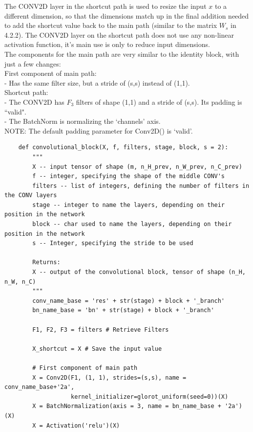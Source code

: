 \documentclass[11pt, a4paper]{article}
\begin{document}
\begin{spacing}{1.1}
	\noindent The CONV2D layer in the shortcut path is used to resize the input $x$ to a different dimension, so that the dimensions match up in the final addition needed to add the shortcut value back to the main path (similar to the matrix $W_s$ in 4.2.2). The CONV2D layer on the shortcut path does not use any non-linear activation function, it's main use is only to reduce input dimensions. \vspace*{2mm}\\
	The components for the main path are very similar to the identity block, with just a few changes: \vspace*{1mm}\\
	First component of main path: \\
	- Has the same filter size, but a stride of (s,s) instead of (1,1). \vspace*{1mm}\\
	Shortcut path: \\
	- The CONV2D has $F_3$ filters of shape (1,1) and a stride of (s,s). Its padding is ``valid".\\
	- The BatchNorm is normalizing the `channels' axis. \vspace*{1mm}\\
	NOTE: The default padding parameter for Conv2D() is `valid'.
	\begin{lstlisting}
	def convolutional_block(X, f, filters, stage, block, s = 2):
		"""
		X -- input tensor of shape (m, n_H_prev, n_W_prev, n_C_prev)
		f -- integer, specifying the shape of the middle CONV's
		filters -- list of integers, defining the number of filters in the CONV layers
		stage -- integer to name the layers, depending on their position in the network
		block -- char used to name the layers, depending on their position in the network
		s -- Integer, specifying the stride to be used
		
		Returns:
		X -- output of the convolutional block, tensor of shape (n_H, n_W, n_C)
		"""
		conv_name_base = 'res' + str(stage) + block + '_branch'
		bn_name_base = 'bn' + str(stage) + block + '_branch'
		
		F1, F2, F3 = filters # Retrieve Filters
		
		X_shortcut = X # Save the input value
		
		# First component of main path 
		X = Conv2D(F1, (1, 1), strides=(s,s), name = conv_name_base+'2a', 
		           kernel_initializer=glorot_uniform(seed=0))(X)
		X = BatchNormalization(axis = 3, name = bn_name_base + '2a')(X)
		X = Activation('relu')(X)
		

\end{lstlisting}
\end{spacing}
\end{document}
